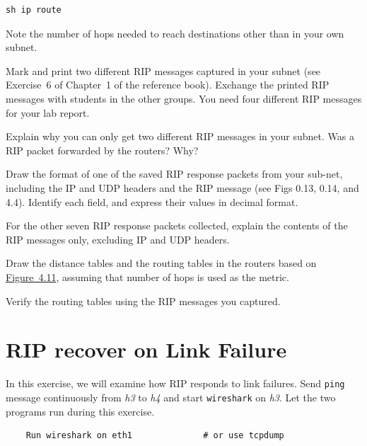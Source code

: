 \documentclass{UTNetLab}
\begin{document}
    \begin{lstlisting}[frame=trBL, language=cisco]
    sh ip route
    \end{lstlisting}
    
    Note the number of hops needed to reach destinations other than in your own subnet.

    Mark and print two different RIP messages captured in your subnet (see Exercise~6 of Chapter~1 of the reference book).
    Exchange the printed RIP messages with students in the other groups.
    You need four different RIP messages for your lab report.
    
    \begin{report}
    \item Explain why you can only get two different RIP messages in your subnet.
    Was a RIP packet forwarded by the routers?
    Why?
    
    \item Draw the format of one of the saved RIP response packets from your sub-net, including the IP and UDP headers and the RIP message (see Figs 0.13, 0.14, and 4.4). Identify each field, and express their values in decimal format.
    
    \item For the other seven RIP response packets collected, explain the contents of the RIP messages only, excluding IP and UDP headers.

    
    \item Draw the distance tables and the routing tables in the routers based on \hyperref[fig:4.11]{Figure~4.11}, assuming that number of hops is used as the metric.

    \item Verify the routing tables using the RIP messages you captured.
    \end{report}


\section{RIP recover on Link Failure}
    In this exercise, we will examine how RIP responds to link failures.
    Send \lstinline{ping} message continuously from \textit{h3} to \textit{h4} and start \lstinline{wireshark} on \textit{h3}.
    Let the two programs run during this exercise.

    \begin{lstlisting}
	Run wireshark on eth1              # or use tcpdump
    \end{lstlisting}
    
\end{document}
